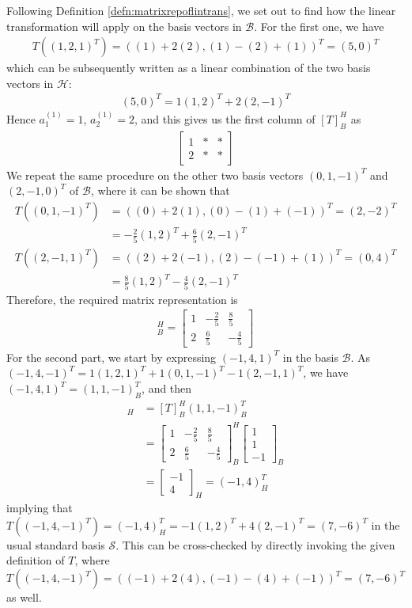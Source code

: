 \begin{solution}
Following Definition \ref{defn:matrixrepoflintrans}, we set out to find how the linear transformation will apply on the basis vectors in $\mathcal{B}$. For the first one, we have
\begin{align*}
T((1,2,1)^T) = ((1)+2(2), (1)-(2)+(1))^T = (5,0)^T
\end{align*}
which can be subsequently written as a linear combination of the two basis vectors in $\mathcal{H}$:
\begin{align*}
(5,0)^T = 1(1,2)^T + 2(2,-1)^T
\end{align*}
Hence $a_1^{(1)} = 1$, $a_2^{(1)} = 2$, and this gives us the first column of $[T]_B^H$ as
\begin{align*}
\begin{bmatrix}
1 & * & * \\
2 & * & * 
\end{bmatrix}
\end{align*}
We repeat the same procedure on the other two basis vectors $(0,1,-1)^T$ and $(2,-1,0)^T$ of $\mathcal{B}$, where it can be shown that
\begin{align*}
T((0,1,-1)^T) &= ((0)+2(1), (0)-(1)+(-1))^T = (2,-2)^T \\
&= -\frac{2}{5}(1,2)^T + \frac{6}{5}(2,-1)^T \\
T((2,-1,1)^T) &= ((2)+2(-1), (2)-(-1)+(1))^T = (0,4)^T \\
&= \frac{8}{5}(1,2)^T - \frac{4}{5}(2,-1)^T
\end{align*}
Therefore, the required matrix representation is
\begin{align*}
[T]_B^H = 
\begin{bmatrix}
1 & -\frac{2}{5} & \frac{8}{5} \\
2 & \frac{6}{5} & -\frac{4}{5}
\end{bmatrix}
\end{align*}
For the second part, we start by expressing $(-1,4,1)^T$ in the basis $\mathcal{B}$. As $(-1,4,-1)^T = 1(1,2,1)^T + 1(0,1,-1)^T - 1(2,-1,1)^T$, we have $(-1,4,1)^T = (1,1,-1)_B^T$, and then
\begin{align*}
[T((1,1,-1)_B^T)]_H &= [T]_B^H (1,1,-1)_B^T \\
&=
\begin{bmatrix}
1 & -\frac{2}{5} & \frac{8}{5} \\
2 & \frac{6}{5} & -\frac{4}{5}
\end{bmatrix}_B^H
\begin{bmatrix}
1 \\
1 \\
-1
\end{bmatrix}_B \\
&=
\begin{bmatrix}
-1 \\
4
\end{bmatrix}_H = (-1,4)^T_H
\end{align*}
implying that $T((-1,4,-1)^T) = (-1,4)_H^T = -1(1,2)^T + 4(2,-1)^T = (7,-6)^T$ in the usual standard basis $\mathcal{S}$. This can be cross-checked by directly invoking the given definition of $T$, where $T((-1,4,-1)^T) = ((-1)+2(4), (-1)-(4)+(-1))^T = (7,-6)^T$ as well.
\end{solution}

